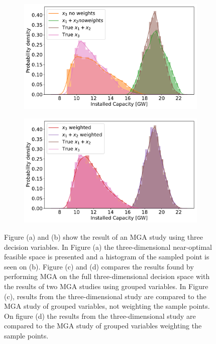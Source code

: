 \begin{figure}[h]
\begin{subfigure}{.5\textwidth}
		\caption{}
		\label{fig:multi_7}
	\end{subfigure}%
	\vspace{10pt}
	\begin{subfigure}{.5\textwidth}
		\centering
		\includegraphics[width=1.\textwidth]{./Images/multi_8}
		\caption{}
		\label{fig:multi_8}
	\end{subfigure}%
	\begin{subfigure}{.5\textwidth}
		\centering
		\includegraphics[width=1.\textwidth]{./Images/multi_9}
		\caption{}
		\label{fig:multi_9}
	\end{subfigure}
	\caption{Figure (a) and (b) show the result of an MGA study using three decision variables. In Figure (a) the three-dimensional near-optimal feasible space is presented and a histogram of the sampled point is seen on (b). Figure (c) and (d) compares the results found by performing MGA on the full three-dimensional decision space with the results of two MGA studies using grouped variables. In Figure (c), results from the three-dimensional study are compared to the MGA study of grouped variables, not weighting the sample points. On figure (d) the results from the three-dimensional study are compared to the MGA study of grouped variables weighting the sample points.}
	\label{fig:multi_comparison}
\end{figure}

